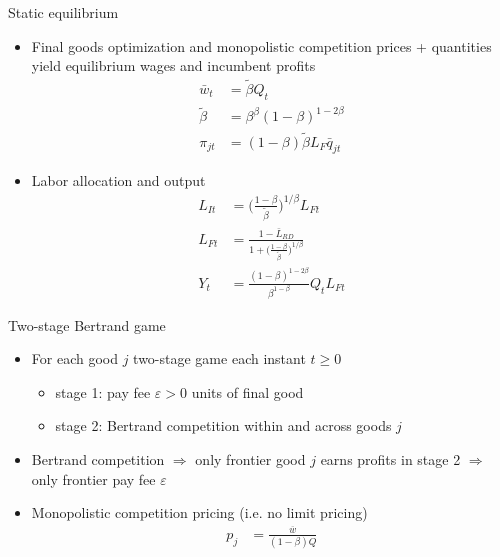 \documentclass[english,usenames,dvipsnames,handout]{beamer}
\begin{document}
\begin{frame}{Static equilibrium}\label{static_eq_conditions}
	\hyperlink{closing_the_model}{}
	\begin{itemize}
		\small 
		\item Final goods optimization and monopolistic competition prices + quantities yield equilibrium wages and incumbent profits 
		\begin{align*}
			\bar{w}_t &= \tilde{\beta} Q_t \\ 
			\tilde{\beta} &= \beta^{\beta} (1-\beta)^{1-2\beta}  \\
			\pi_{jt} &= (1-\beta) \tilde{\beta} L_F \bar{q}_{jt}
		\end{align*}
		\small
		\item Labor allocation and output
		\begin{align*}
			L_{It} &= \Big( \frac{1-\beta}{\tilde{\beta}} \Big)^{1 / \beta} L_{Ft} \\
			L_{Ft} &= \frac{1 - \bar{L}_{RD}}{1 + \Big(\frac{1-\beta}{\tilde{\beta}}\Big)^{1/\beta}} \\
			Y_t &= \frac{(1-\beta)^{1-2\beta}}{\beta^{1-\beta}} Q_t L_{Ft} 
		\end{align*}
	\end{itemize}
\end{frame}

\begin{frame}{Two-stage Bertrand game}\label{two_stage_bertrand2}
	\hyperlink{intermediate_goods_production}{}
	\begin{itemize}
		\item For each good $j$ two-stage game each instant $t \ge 0$
		\begin{itemize}
			\item stage 1: pay fee $\varepsilon > 0$ units of final good
			\item stage 2: Bertrand competition within and across goods $j$
		\end{itemize}
		\item Bertrand competition $\Rightarrow$ only frontier good $j$ earns profits in stage 2 $\Rightarrow$ only frontier pay fee $\varepsilon$
		\item Monopolistic competition pricing (i.e. no limit pricing)
		\begin{align*}
		p_j &= \frac{\overline{w}}{(1-\beta) Q} \\
		\end{align*}
	\end{itemize}
\end{frame}
\end{document}
